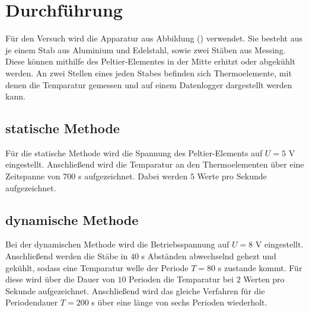 \section{Durchführung}
Für den Versuch wird die Apparatur aus Abbildung () verwendet. Sie besteht aus je einem Stab aus Aluminium und Edelstahl, sowie zwei Stäben aus Messing. Diese können mithilfe des Peltier-Elementes in der Mitte erhitzt oder abgekühlt werden. An zwei Stellen eines jeden Stabes befinden sich Thermoelemente, mit denen 
die Temparatur gemessen und auf einem Datenlogger dargestellt werden kann.
\subsection{statische Methode}
Für die statische Methode wird die Spannung des Peltier-Elements auf $U=5$ V eingestellt. Anschließend wird die Temparatur an den Thermoelementen über eine Zeitspanne von $700$ s aufgezeichnet. Dabei werden $5$ Werte pro Sekunde aufgezeichnet.
\subsection{dynamische Methode}
Bei der dynamischen Methode wird die Betriebsspannung auf $U=8$ V eingestellt. Anschließend werden die Stäbe in $40$ s Abständen abwechselnd gehezt und gekühlt, sodass eine Temparatur welle der Periode $T=80$ s zustande kommt. Für diese wird über die Dauer von $10$ Perioden die Temparatur bei $2$ Werten pro Sekunde aufgezeichnet. Anschließend wird das gleiche Verfahren für die Periodendauer $T=200$ s über eine länge von sechs Perioden wiederholt.
